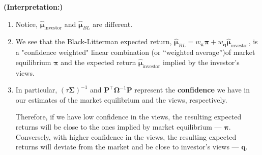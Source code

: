 \documentclass[13pt]{article}
\theoremstyle{definition}
\theoremstyle{remark}
\newenvironment{remark}
  {\pushQED{\qed}\renewcommand{\qedsymbol}{$\triangle$}\remarkx}
  {\popQED\endremarkx}
\begin{document}
\begin{remark}\textbf{(Interpretation:)}\hfill
\begin{enumerate}
    \item Notice, $\bm{\hat{\bm{\mu}}}_{\text{investor}}$ and $\bm{\hat{\bm{\mu}}}_{BL}$ are different.
    \item We see that the Black-Litterman expected return, $\bm{\hat{\bm{\mu}}}_{BL}= w_{\bm{\pi}}\bm{\pi} +w_{\bm{q}}\bm{\hat{\bm{\mu}}}_{\text{investor}}$, is a "confidence weighted" linear combination (or ``weighted average'')of market equilibrium $\bm{\pi}$ and the expected return $\bm{\hat{\bm{\mu}}}_{\text{investor}}$ implied by the investor's views.
    \item In particular, $(\tau \mathbf{\Sigma})^{-1}$ and $\mathbf{P}^{\top} \mathbf{\Omega}^{-1} \mathbf{P}$ represent the {\color{C6}\textbf{confidence}} we have in our estimates of the market equilibrium and the views, respectively. 
    
    Therefore, if we have low confidence in the views, the resulting expected returns will be close to the ones implied by market equilibrium --- $\bm{\pi}$. Conversely, with higher confidence in the views, the resulting expected returns will deviate from the market and be close to investor's views --- $\bm{q}$.
\end{enumerate}
\end{remark}
\end{document}
